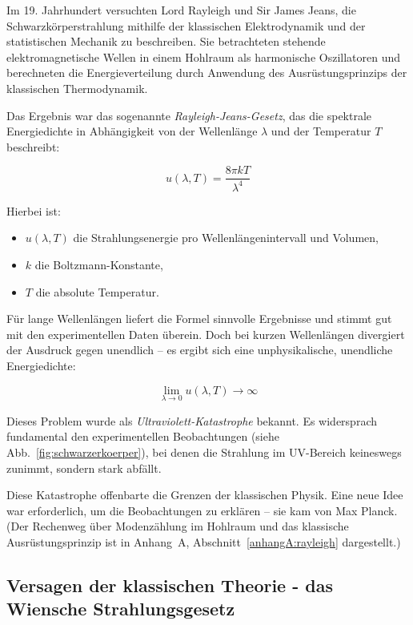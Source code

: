 Im 19. Jahrhundert versuchten Lord Rayleigh und Sir James Jeans, die Schwarzkörperstrahlung mithilfe der klassischen Elektrodynamik und der statistischen Mechanik zu beschreiben. Sie betrachteten stehende elektromagnetische Wellen in einem Hohlraum als harmonische Oszillatoren und berechneten die Energieverteilung durch Anwendung des Ausrüstungsprinzips der klassischen Thermodynamik.

Das Ergebnis war das sogenannte \emph{Rayleigh-Jeans-Gesetz}, das die spektrale Energiedichte in Abhängigkeit von der Wellenlänge \( \lambda \) und der Temperatur \( T \) beschreibt:

\[
u(\lambda, T) = \frac{8 \pi k T}{\lambda^4}
\]

Hierbei ist:
\begin{itemize}
	\item \( u(\lambda, T) \) die Strahlungsenergie pro Wellenlängenintervall und Volumen,
	\item \( k \) die Boltzmann-Konstante,
	\item \( T \) die absolute Temperatur.
\end{itemize}

Für lange Wellenlängen liefert die Formel sinnvolle Ergebnisse und stimmt gut mit den experimentellen Daten überein. Doch bei kurzen Wellenlängen divergiert der Ausdruck gegen unendlich – es ergibt sich eine unphysikalische, unendliche Energiedichte:

\[
\lim_{\lambda \to 0} u(\lambda, T) \to \infty
\]

Dieses Problem wurde als \emph{Ultraviolett-Katastrophe} bekannt. Es widersprach fundamental den experimentellen Beobachtungen (siehe Abb.~\ref{fig:schwarzerkoerper}), bei denen die Strahlung im UV-Bereich keineswegs zunimmt, sondern stark abfällt.

Diese Katastrophe offenbarte die Grenzen der klassischen Physik. Eine neue Idee war erforderlich, um die Beobachtungen zu erklären – sie kam von Max Planck.
(Der Rechenweg über Modenzählung im Hohlraum und das klassische Ausrüstungsprinzip ist in Anhang~A, Abschnitt~\ref{anhangA:rayleigh} dargestellt.)
\subsection{Versagen der klassischen Theorie - \newline das Wiensche Strahlungsgesetz}

